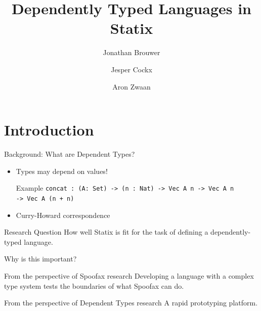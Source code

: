 \documentclass[aspectratio=43]{beamer}
\title[]{Dependently Typed Languages in Statix}
\institute[]{Delft University of Technology, The Netherlands}
\author{Jonathan Brouwer \and Jesper Cockx \and Aron Zwaan}
\begin{document}
\section{Introduction}
{
\frame{\titlepage}
}

\begin{frame}[fragile]{Background: What are Dependent Types?}
\begin{itemize}
	\item Types may depend on values!
	\begin{exampleblock}{Example}
		\texttt{concat : (A: Set) -> (n : Nat) -> Vec A n -> Vec A n
			\\ \hspace*{48pt} -> Vec A (n + n)}
	\end{exampleblock}
	\item Curry-Howard correspondence
\end{itemize}


\end{frame}

\begin{frame}[fragile]{Research Question}
How well Statix is fit for the task of defining a dependently-typed language.
\end{frame}

\begin{frame}[fragile]{Why is this important?}
	\begin{block}{From the perspective of Spoofax research}
		Developing a language with a complex type system tests the boundaries of what Spoofax can do.
	\end{block}
	
	\begin{block}{From the perspective of Dependent Types research}
		A rapid prototyping platform.
	\end{block}
\end{frame}
\end{document}
